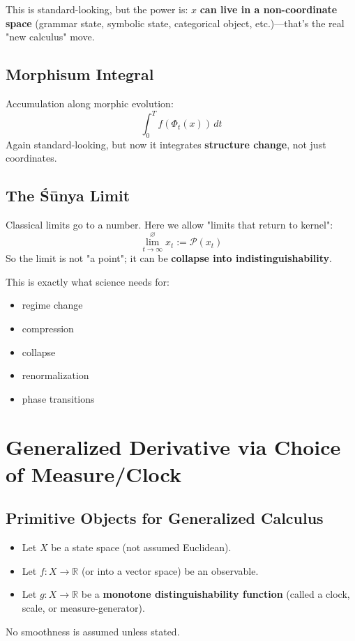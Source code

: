 \documentclass[12pt, oneside]{article}
\begin{document}
This is standard-looking, but the power is: $x$ \textbf{can live in a non-coordinate space} (grammar state, symbolic state, categorical object, etc.)—that's the real "new calculus" move.

\subsection{Morphisum Integral}

Accumulation along morphic evolution:
\begin{equation}
\int_0^T f(\Phi_t(x)) \, dt
\end{equation}
Again standard-looking, but now it integrates \textbf{structure change}, not just coordinates.

\subsection{The Śūnya Limit}

Classical limits go to a number. Here we allow "limits that return to kernel":
\begin{equation}
\overset{\varnothing}{\lim_{t \to \infty}} x_t := \mathcal{P}(x_t)
\end{equation}
So the limit is not "a point"; it can be \textbf{collapse into indistinguishability}.

This is exactly what science needs for:
\begin{itemize}
    \item regime change
    \item compression
    \item collapse
    \item renormalization
    \item phase transitions
\end{itemize}

\section{Generalized Derivative via Choice of Measure/Clock}

\subsection{Primitive Objects for Generalized Calculus}

\begin{itemize}
    \item Let $X$ be a state space (not assumed Euclidean).
    \item Let $f: X \rightarrow \mathbb{R}$ (or into a vector space) be an observable.
    \item Let $g: X \rightarrow \mathbb{R}$ be a \textbf{monotone distinguishability function} (called a clock, scale, or measure-generator).
\end{itemize}
No smoothness is assumed unless stated.
\end{document}
